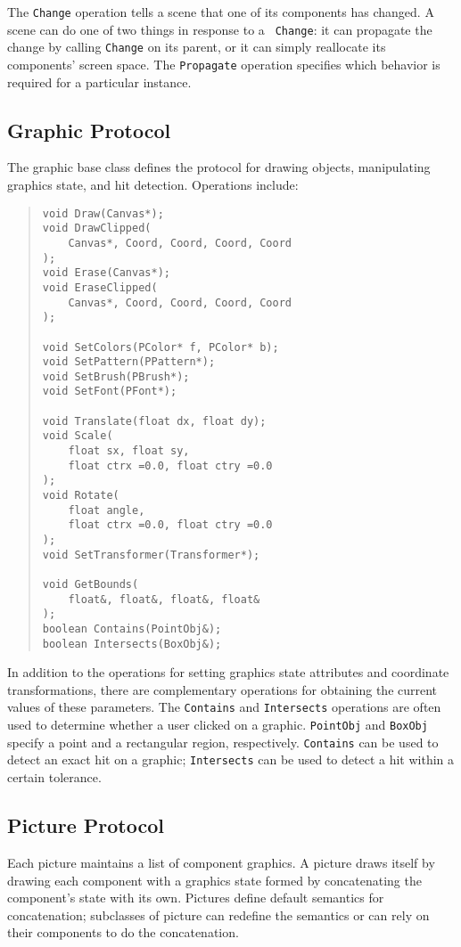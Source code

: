 The {\tt Change} operation tells a scene that one of its components
has changed.
A scene can do one of two things in response to a {\tt
Change}: it can propagate the
change by calling {\tt Change} on its parent, or it can simply
reallocate its components' screen space.  The
{\tt Propagate} operation specifies which behavior is
required for a particular instance.

\subsection*{Graphic Protocol}

The graphic base class defines the protocol for drawing objects,
manipulating graphics state, and hit detection.  Operations include:
\pagebreak
\begin{quote}
\small
\begin{verbatim}
void Draw(Canvas*);
void DrawClipped(
    Canvas*, Coord, Coord, Coord, Coord
);
void Erase(Canvas*);
void EraseClipped(
    Canvas*, Coord, Coord, Coord, Coord
);

void SetColors(PColor* f, PColor* b);
void SetPattern(PPattern*);
void SetBrush(PBrush*);
void SetFont(PFont*);

void Translate(float dx, float dy);
void Scale(
    float sx, float sy, 
    float ctrx =0.0, float ctry =0.0
);
void Rotate(
    float angle, 
    float ctrx =0.0, float ctry =0.0
);
void SetTransformer(Transformer*);

void GetBounds(
    float&, float&, float&, float&
);
boolean Contains(PointObj&);
boolean Intersects(BoxObj&);
\end{verbatim}
\end{quote}

In addition to the operations for setting graphics state attributes
and coordinate transformations, there are complementary operations for
obtaining the current values of these parameters.
The {\tt Contains} and {\tt Intersects} operations are often used to 
determine whether a user clicked on a graphic.
{\tt PointObj} and {\tt BoxObj}
specify a point and a rectangular region, respectively.
{\tt Contains} can be used to detect an
exact hit on a graphic; {\tt Intersects} can be used to detect a hit
within a certain tolerance.

\subsection*{Picture Protocol}

Each picture maintains a list of component graphics.  A picture draws
itself by drawing each component with a graphics state formed by
concatenating the component's state with its own.  Pictures define
default semantics for concatenation; subclasses of
picture can redefine the semantics or can rely on their components to do
the concatenation.

